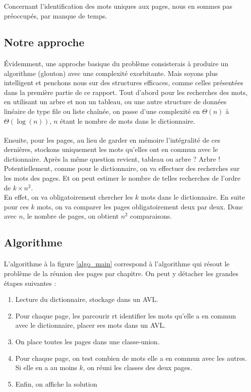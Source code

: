 \documentclass[a4paper]{article}
\begin{document}
		\subparagraph{}{
		Concernant l'identification des mots uniques aux pages, nous en sommes pas
		préoccupés, par manque de temps.
		}
	
	
		\subsection{Notre approche}
		
			\paragraph{}{
			Évidemment, une approche basique du problème consisterais à produire un algorithme (glouton) avec une complexité
			exorbitante. Mais soyons plus intelligent et penchons nous sur des structures efficaces, comme celles présentées
			dans la première partie de ce rapport. Tout d'abord pour les recherches des mots, en utilisant un arbre et non
			un tableau, ou une autre structure de données linéaire de type file ou liste chaînée, on passe d'une complexité
			en $\Theta(n)$ à $\Theta(\log(n))$, $n$ étant le nombre de mots dans le dictionnaire.
			}
			\paragraph{}{
			Ensuite, pour les pages, au lieu de garder en mémoire l'intégralité de ces dernières, stockons 
			uniquement les mots qu'elles ont en commun avec le dictionnaire. Après la même question revient, tableau
			ou arbre ? Arbre ! Potentiellement, comme pour le dictionnaire, on va effectuer des recherches sur les mots des pages.
			Et on peut estimer le nombre de telles recherches de l'ordre de $k \times n^{2}$. \\
			En effet, on va obligatoirement chercher les $k$ mots dans le dictionnaire. En suite pour ces $k$ mots, on va comparer
			les pages obligatoirement deux par deux. Donc avec $n$, le nombre de pages, on obtient $n^{2}$ comparaisons.
			}

		\subsection{Algorithme}
			\paragraph{}{
			L'algorithme à la figure \ref{algo_main} correspond à l'algorithme qui résout le problème
			de la réunion des pages par chapitre. On peut y détacher les grandes étapes suivantes :
			\begin{enumerate}
				\item Lecture du dictionnaire, stockage dans un AVL.
				\item Pour chaque page, les parcourir rt identifier les mots qu'elle
				a en commun avec le dictionnaire, placer ses mots dans un AVL.
				\item On place toutes les pages dans une classe-union.
				\item Pour chaque page, on test combien de mots elle a en commun avec les autres.
				Si elle en a au moins $k$, on réuni les classes des deux pages.
				\item Enfin, on affiche la solution
			\end{enumerate} 
		 	}
\end{document}
